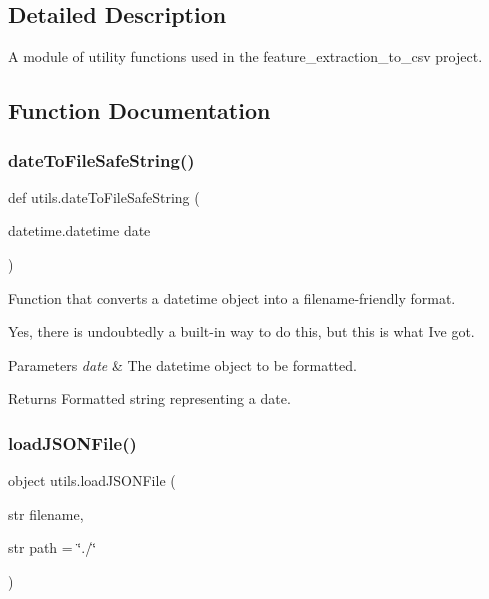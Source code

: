 \subsection{Detailed Description}
A module of utility functions used in the feature\+\_\+extraction\+\_\+to\+\_\+csv project. 

\subsection{Function Documentation}
\mbox{\label{namespaceutils_ab2f8ec31af461e89fcc8e5d030cfd5fc}} 
\subsubsection{\texorpdfstring{dateToFileSafeString()}{dateToFileSafeString()}}
{\footnotesize\ttfamily def utils.\+date\+To\+File\+Safe\+String (\begin{DoxyParamCaption}\item[{datetime.\+datetime}]{date }\end{DoxyParamCaption})}



Function that converts a datetime object into a filename-\/friendly format. 

Yes, there is undoubtedly a built-\/in way to do this, but this is what I\textquotesingle{}ve got. 
\begin{DoxyParams}{Parameters}
{\em date} & The datetime object to be formatted. \\
\hline
\end{DoxyParams}
\begin{DoxyReturn}{Returns}
Formatted string representing a date. 
\end{DoxyReturn}
\mbox{\label{namespaceutils_a05bb98273ce91cd5c7922286b703596f}} 
\subsubsection{\texorpdfstring{loadJSONFile()}{loadJSONFile()}}
{\footnotesize\ttfamily  object utils.\+load\+J\+S\+O\+N\+File (\begin{DoxyParamCaption}\item[{str}]{filename,  }\item[{str }]{path = {\ttfamily \char`\"{}./\char`\"{}} }\end{DoxyParamCaption})}



